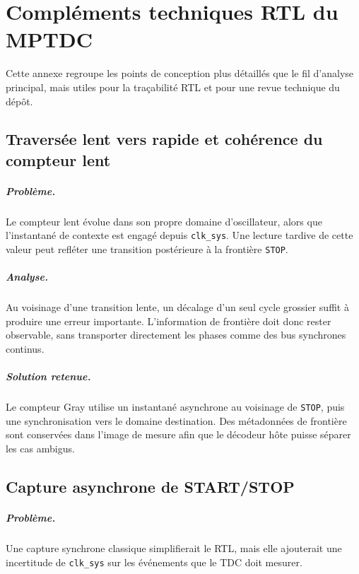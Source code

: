 \chapter{Compléments techniques RTL du MPTDC}
\label{chap:annexe-rtl}
\justifying
\sloppy

Cette annexe regroupe les points de conception plus détaillés que le fil d'analyse principal, mais utiles pour la traçabilité RTL et pour une revue technique du dépôt.

\section{Traversée lent vers rapide et cohérence du compteur lent}

\paragraph{Problème.}
Le compteur lent évolue dans son propre domaine d'oscillateur, alors que l'instantané de contexte est engagé depuis \texttt{clk\_sys}. Une lecture tardive de cette valeur peut refléter une transition postérieure à la frontière \texttt{STOP}.

\paragraph{Analyse.}
Au voisinage d'une transition lente, un décalage d'un seul cycle grossier suffit à produire une erreur importante. L'information de frontière doit donc rester observable, sans transporter directement les phases comme des bus synchrones continus.

\paragraph{Solution retenue.}
Le compteur Gray utilise un instantané asynchrone au voisinage de \texttt{STOP}, puis une synchronisation vers le domaine destination. Des métadonnées de frontière sont conservées dans l'image de mesure afin que le décodeur hôte puisse séparer les cas ambigus.

\section{Capture asynchrone de START/STOP}

\paragraph{Problème.}
Une capture synchrone classique simplifierait le RTL, mais elle ajouterait une incertitude de \texttt{clk\_sys} sur les événements que le TDC doit mesurer.

